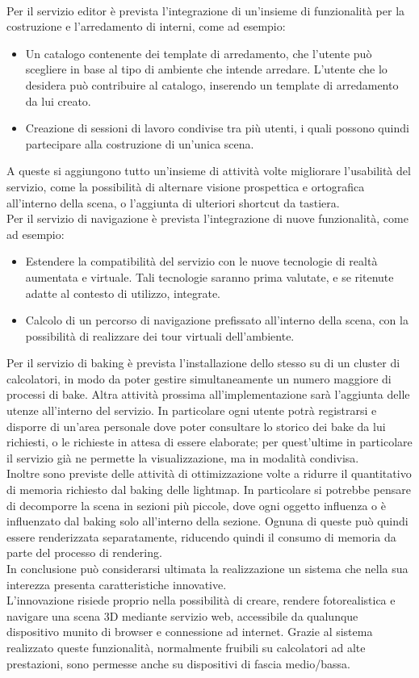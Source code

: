 \\
Per il servizio editor è prevista l’integrazione di un’insieme di funzionalità per la costruzione e l’arredamento di interni, come ad esempio:
\begin{itemize}
\item Un catalogo contenente dei template di arredamento, che l’utente può scegliere in base al tipo di ambiente che intende arredare. L’utente che lo desidera può contribuire al catalogo, inserendo un template di arredamento da lui creato.
\item Creazione di sessioni di lavoro condivise tra più utenti, i quali possono quindi partecipare alla costruzione di un’unica scena.
\end{itemize}
A queste si aggiungono tutto un’insieme di attività volte migliorare l’usabilità del servizio, come la possibilità di alternare visione prospettica e ortografica all’interno della scena, o l’aggiunta di ulteriori shortcut da tastiera.
\\
Per il servizio di navigazione è prevista l’integrazione di nuove funzionalità, come ad esempio:
\begin{itemize}
\item Estendere la compatibilità del servizio con le nuove tecnologie di realtà aumentata e virtuale. Tali tecnologie saranno prima valutate, e se ritenute adatte al contesto di utilizzo, integrate. 
\item Calcolo di un percorso di navigazione prefissato all’interno della scena, con la possibilità di realizzare dei tour virtuali dell’ambiente.
\end{itemize}

Per il servizio di baking è prevista l’installazione dello stesso su di un cluster di calcolatori, in modo da poter gestire simultaneamente un numero maggiore di processi di bake. 
Altra attività prossima all’implementazione sarà l’aggiunta delle utenze all’interno del servizio. In particolare ogni utente potrà registrarsi e disporre di un’area personale dove poter consultare lo storico dei bake da lui richiesti, o le richieste in attesa di essere elaborate; per quest’ultime in particolare il servizio già ne permette la visualizzazione, ma in modalità condivisa.
\\ 
Inoltre sono previste delle attività di ottimizzazione volte a ridurre il quantitativo di memoria richiesto dal baking delle lightmap. In particolare si potrebbe pensare di decomporre la scena in sezioni più piccole, dove ogni oggetto influenza o è influenzato dal baking solo all’interno della sezione. Ognuna di queste può quindi essere renderizzata separatamente, riducendo quindi il consumo di memoria da parte del processo di rendering.
\\
In conclusione può considerarsi ultimata la realizzazione un sistema che nella sua interezza presenta caratteristiche innovative.
\\
L’innovazione risiede proprio nella possibilità di creare, rendere fotorealistica e navigare una scena 3D mediante servizio web, accessibile da qualunque dispositivo munito di browser e connessione ad internet. Grazie al sistema realizzato queste funzionalità, normalmente fruibili su calcolatori ad alte prestazioni, sono permesse anche su dispositivi di fascia medio/bassa.